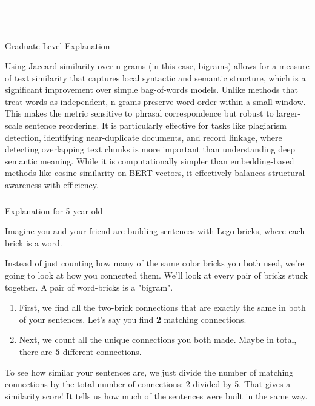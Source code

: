 \documentclass{article}
\begin{document}
\noindent\rule{\textwidth}{0.4pt}\\

\newpage

\subsubsection*{\normalfont}{Graduate Level Explanation}

\parbox{\textwidth}{
Using Jaccard similarity over n-grams (in this case, bigrams) allows for a measure of text similarity that captures local syntactic and semantic structure, which is a significant improvement over simple bag-of-words models. Unlike methods that treat words as independent, n-grams preserve word order within a small window. This makes the metric sensitive to phrasal correspondence but robust to larger-scale sentence reordering. It is particularly effective for tasks like plagiarism detection, identifying near-duplicate documents, and record linkage, where detecting overlapping text chunks is more important than understanding deep semantic meaning. While it is computationally simpler than embedding-based methods like cosine similarity on BERT vectors, it effectively balances structural awareness with efficiency.
}

\subsubsection*{\normalfont}{Explanation for 5 year old}

\parbox{\textwidth}{
Imagine you and your friend are building sentences with Lego bricks, where each brick is a word.

Instead of just counting how many of the same color bricks you both used, we're going to look at how you connected them. We'll look at every pair of bricks stuck together. A pair of word-bricks is a "bigram".

\begin{enumerate}
    \item First, we find all the two-brick connections that are exactly the same in both of your sentences. Let's say you find \textbf{2} matching connections.
    \item Next, we count all the unique connections you both made. Maybe in total, there are \textbf{5} different connections.
\end{enumerate}

To see how similar your sentences are, we just divide the number of matching connections by the total number of connections: 2 divided by 5. That gives a similarity score! It tells us how much of the sentences were built in the same way.
}
\end{document}

